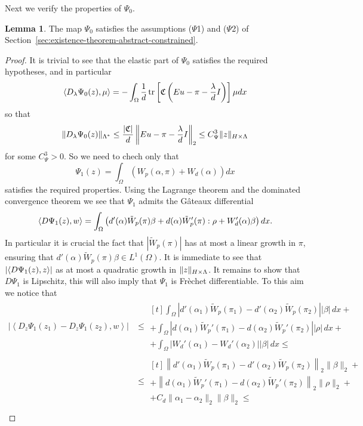 \documentclass[a4paper,10pt,twoside]{amsbook}
\numberwithin{section}{chapter}
\numberwithin{equation}{chapter}
\theoremstyle{definition}
\newtheorem{lemma}[prop]{Lemma}
\DeclareMathOperator{\tr}{tr}
\DeclarePairedDelimiter{\norm}{\lVert}{\rVert}
\DeclarePairedDelimiter{\dual}{\langle}{\rangle}
\begin{document}
Next we verify the properties of $\Psi_0$.
\begin{lemma}
The map $\Psi_0$ satisfies the assumptions ($\Psi$1) and ($\Psi$2) of Section~\ref{sec:existence-theorem-abstract-constrained}.
\end{lemma}
\begin{proof}
It is trivial to see that the elastic part of $\Psi_0$ satisfies the required hypotheses, and in particular
\[
\dual{D_\lambda\Psi_0(z),\mu}=-\int_\Omega\frac{1}{d}\tr\left[\mathfrak{C}\left(Eu-\pi-\frac{\lambda}{d}I\right)\right]\mu dx
\]
so that
\[
\norm{D_\lambda\Psi_0(z)}_{\Lambda^*}\le\frac{|\mathfrak{C}|}{d}\left\|Eu-\pi-\frac{\lambda}{d}I\right\|_2\le C_\Psi^3\norm{z}_{H\times\Lambda}
\]
for some $C_\Psi^3>0$. So we need to chech only that
\[
\Psi_1(z)=\int_\Omega\left(W_p(\alpha,\pi)+W_d(\alpha)\right)dx
\]
satisfies the required properties. Using the Lagrange theorem and the dominated convergence theorem we see that $\Psi_1$ admits the G\^ateaux differential
\[
\dual{D\Psi_1(z),w}=\int_\Omega\left(d'(\alpha)\tilde W_p(\pi)\beta+d(\alpha)\tilde W_p'(\pi):\rho+W_d'(\alpha)\beta\right)dx.
\]
In particular it is crucial the fact that $|\tilde W_p(\pi)|$ has at most a linear growth in $\pi$, ensuring that $d'(\alpha)\tilde W_p(\pi)\beta\in L^1(\Omega)$. It is immediate to see that $|\dual{D\Psi_1(z),z}|$ as at most a quadratic growth in $\norm{z}_{H\times\Lambda}$. It remains to show that $D\Psi_1$ is Lipschitz, this will also imply that $\Psi_1$ is Frèchet differentiable. To this aim we notice that
\[
\begin{split}
\left|\left\langle D_z\Psi_1(z_1)-D_z\Psi_1(z_2),w\right\rangle\right|&\le
\begin{multlined}[t]
\int_{\Omega}\left|d'(\alpha_1)\tilde W_p(\pi_1)-d'(\alpha_2)\tilde W_p(\pi_2)\right||\beta|\,dx+\\
+\int_{\Omega}\left|d(\alpha_1)\tilde W_p'(\pi_1)-d(\alpha_2)\tilde W_p'(\pi_2)\right||\rho|\,dx+\\
+\int_{\Omega}\left|W_d'(\alpha_1)-W_d'(\alpha_2)\right||\beta|\,dx\le
\end{multlined}\\
&\le
\begin{multlined}[t]
\left\|d'(\alpha_1)\tilde W_p(\pi_1)-d'(\alpha_2)\tilde W_p(\pi_2)\right\|_2\|\beta\|_2+\\
+\left\|d(\alpha_1)\tilde W_p'(\pi_1)-d(\alpha_2)\tilde W_p'(\pi_2)\right\|_2\|\rho\|_2+\\
+C_d\|\alpha_1-\alpha_2\|_2\|\beta\|_2\le
\end{multlined}\\

\end{split}\]
\end{proof}
\end{document}
